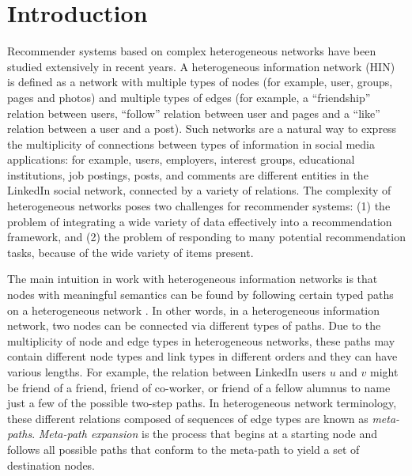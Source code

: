 \documentclass {acmart}
\begin{document}





\maketitle

\section{Introduction}

\noindent Recommender systems based on complex heterogeneous  networks have been studied extensively in recent years. A heterogeneous information network (HIN) is defined as a network with multiple types of nodes \cite{shi2015survey} (for example, user, groups, pages and photos) and multiple types of edges (for example, a ``friendship'' relation between  users, ``follow'' relation between user and pages and a ``like'' relation between a user and a post).  Such networks are a natural way to express the multiplicity of connections between types of information in social media applications: for example,  users, employers, interest groups, educational institutions, job postings, posts, and comments are different entities in the LinkedIn social network, connected by a variety of relations. The complexity of heterogeneous networks poses two challenges for recommender systems: (1) the problem of integrating a wide variety of data effectively into a recommendation framework, and (2) the problem of responding to many potential recommendation tasks, because of the wide variety of items present.

The main intuition in work with heterogeneous information networks is that nodes with meaningful semantics can be found by following certain typed paths on a heterogeneous network \cite{yu2014personalized}. In other words, in a heterogeneous information network, two nodes can be connected via different types of paths. Due to the multiplicity of node and edge types in heterogeneous networks, these paths may contain different node types and link types in different orders and they can have various lengths. For example, the relation between LinkedIn users $u$ and $v$ might be friend of a friend, friend of co-worker, or friend of a fellow alumnus to name just a few of the possible two-step paths. In heterogeneous network terminology, these different relations composed of sequences of edge types are known as \textit{meta-paths}. \textit{Meta-path expansion} is the process that begins at a starting node and follows all possible paths that conform to the meta-path to yield a set of destination nodes.
\end{document}
